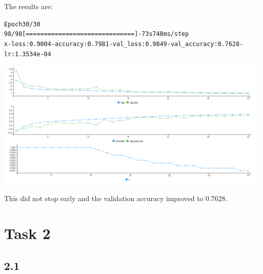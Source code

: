 \documentclass[10pt, a4paper, english]{article}\usepackage[]{graphicx}\usepackage[dvipsnames]{xcolor}
\makeatletter
\def\maxwidth{ %
  \ifdim\Gin@nat@width>\linewidth
    \linewidth
  \else
    \Gin@nat@width
  \fi
}
\newenvironment{kframe}{%
 \def\at@end@of@kframe{}%
 \ifinner\ifhmode%
  \def\at@end@of@kframe{\end{minipage}}%
  \begin{minipage}{\columnwidth}%
 \fi\fi%
 \def\FrameCommand##1{\hskip\@totalleftmargin \hskip-\fboxsep
 \colorbox{shadecolor}{##1}\hskip-\fboxsep
     \hskip-\linewidth \hskip-\@totalleftmargin \hskip\columnwidth}%
 \MakeFramed {\advance\hsize-\width
   \@totalleftmargin\z@ \linewidth\hsize
   \@setminipage}}%
 {\par\unskip\endMakeFramed%
 \at@end@of@kframe}
\newenvironment{knitrout}{}{} %
\makeatother
\begin{document}
The results are:


\begin{knitrout}
\color{fgcolor}\begin{kframe}
\begin{alltt}
Epoch 30/30
98/98 [==============================] - 73s 748ms/step 
x- loss: 0.9004 - accuracy: 0.7981 - val_loss: 0.9849 - val_accuracy: 0.7628 - lr: 1.3534e-04
\end{alltt}
\end{kframe}
\end{knitrout}


\begin{knitrout}
\color{fgcolor}
\includegraphics[width=\maxwidth]{cifar_model_4} 
\end{knitrout}

This did not stop early and the validation accuracy improved to 0.7628.

\section{Task 2}
\subsection{2.1}
\end{document}

